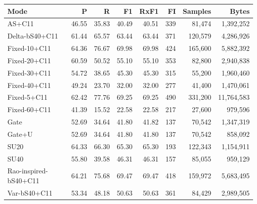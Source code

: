 \setlength{\tabcolsep}{3pt}\begin{tabular}{lrrrrrrr}\toprule
Mode & P & R & F1 & RxF1 & FI & Samples & Bytes \\\midrule
AS+C11 & 46.55 & 35.83 & 40.49 & 40.51 & 339 & 81,474 & 1,392,252 \\
Delta-bS40+C11 & 61.44 & 65.57 & 63.44 & 63.44 & 371 & 120,579 & 4,286,926 \\
Fixed-10+C11 & 64.36 & 76.67 & 69.98 & 69.98 & 424 & 165,600 & 5,882,392 \\
Fixed-20+C11 & 60.59 & 50.52 & 55.10 & 55.10 & 353 & 82,800 & 2,940,838 \\
Fixed-30+C11 & 54.72 & 38.65 & 45.30 & 45.30 & 315 & 55,200 & 1,960,460 \\
Fixed-40+C11 & 49.24 & 23.70 & 32.00 & 32.00 & 277 & 41,400 & 1,470,061 \\
Fixed-5+C11 & 62.42 & 77.76 & 69.25 & 69.25 & 490 & 331,200 & 11,764,583 \\
Fixed-60+C11 & 41.39 & 15.52 & 22.58 & 22.58 & 217 & 27,600 & 979,596 \\
Gate & 52.69 & 34.64 & 41.80 & 41.82 & 137 & 70,542 & 1,347,319 \\
Gate+U & 52.69 & 34.64 & 41.80 & 41.80 & 137 & 70,542 & 858,092 \\
SU20 & 64.33 & 66.30 & 65.30 & 65.30 & 193 & 122,343 & 1,154,911 \\
SU40 & 55.80 & 39.58 & 46.31 & 46.31 & 157 & 85,055 & 959,129 \\
Rao-inspired-bS40+C11 & 64.21 & 75.68 & 69.47 & 69.47 & 418 & 159,972 & 5,683,495 \\
Var-bS40+C11 & 53.34 & 48.18 & 50.63 & 50.63 & 361 & 84,429 & 2,989,505 \\
\bottomrule\end{tabular}
